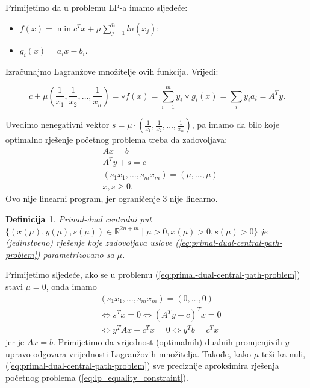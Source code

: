 \documentclass[a4paper, utf8, 11pt, colorlinks]{article}
\newtheorem{definition}{Definicija}
\begin{document}
Primijetimo da u problemu LP-a imamo sljedeće:
\begin{itemize}
	\item $f(x) = \min c^T x + \mu \sum_{j=1}^n ln(x_j) $;
	\item $g_i(x) = a_i x - b_i$.
\end{itemize}
Izračunajmo Lagranžove množitelje ovih funkcija. Vrijedi:

$$c + \mu (\frac{1}{x_1}, \frac{1}{x_2}, \ldots, \frac{1}{x_n}) = \triangledown f (x) =\sum_{i=1}^m y_i \triangledown g_i(x) = \sum_{i} y_i a_i = A^T y.$$ 

Uvedimo nenegativni vektor $s =\mu \cdot (\frac{1}{x_1}, \frac{1}{x_2}, \ldots, \frac{1}{x_n})$, pa imamo da bilo koje optimalno rješenje početnog problema treba da zadovoljava:
\begin{align}
	&A x = b \nonumber \\
	&A^T y + s = c  \nonumber \\
	& (s_1 x_1, \ldots, s_m x_m) = (\mu, \ldots, \mu) \label{eq:primal-dual-central-path-problem} \\
	& x, s \geq 0. \nonumber
\end{align}
Ovo nije linearni program, jer ograničenje 3 nije linearno.

\begin{definition}
	Primal-dual centralni put $\{(x(\mu), y(\mu), s(\mu)) \in \mathbb{R}^{2n + m} \mid \mu > 0, x(\mu) >0, s(\mu)>0 \}$ je (jedinstveno) rješenje koje zadovoljava uslove (\ref{eq:primal-dual-central-path-problem}) parametrizovano sa $\mu$. 
\end{definition}

Primijetimo sljedeće, ako se u problemu (\ref{eq:primal-dual-central-path-problem}) stavi $\mu = 0$, onda imamo 
\begin{align*}
	&(s_1 x_1, \ldots, s_m x_m) = (0, \ldots, 0) \\
	&\Longleftrightarrow s^T x = 0  \Longleftrightarrow (A^T y - c)^T x = 0 \\
	&\Longleftrightarrow y^T A x - c^T x = 0 \Longleftrightarrow y^T b = c^Tx
\end{align*}
jer je $Ax = b$. Primijetimo da   vrijednost (optimalnih) dualnih promjenjivih $y$ upravo odgovara vrijednosti Lagranžovih množitelja. Takođe, kako $\mu$ teži ka nuli,   (\ref{eq:primal-dual-central-path-problem}) sve preciznije aproksimira rješenja početnog problema (\ref{eq:lp_equality_constraint}). 
\end{document}
